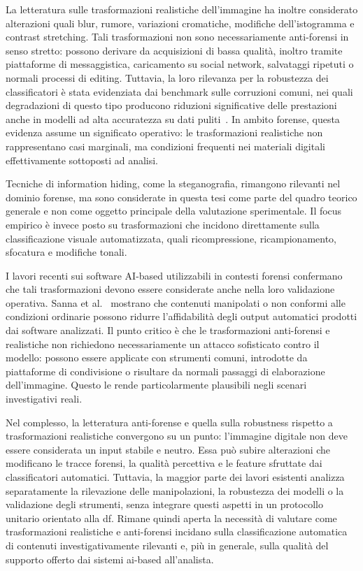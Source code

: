 La letteratura sulle trasformazioni realistiche dell'immagine ha inoltre considerato alterazioni quali blur, rumore, variazioni cromatiche, modifiche dell'istogramma e contrast stretching. Tali trasformazioni non sono necessariamente anti-forensi in senso stretto: possono derivare da acquisizioni di bassa qualità, inoltro tramite piattaforme di messaggistica, caricamento su social network, salvataggi ripetuti o normali processi di editing. Tuttavia, la loro rilevanza per la robustezza dei classificatori è stata evidenziata dai benchmark sulle corruzioni comuni, nei quali degradazioni di questo tipo producono riduzioni significative delle prestazioni anche in modelli ad alta accuratezza su dati puliti~\cite{hendrycks2019benchmarking}. In ambito forense, questa evidenza assume un significato operativo: le trasformazioni realistiche non rappresentano casi marginali, ma condizioni frequenti nei materiali digitali effettivamente sottoposti ad analisi.

Tecniche di information hiding, come la steganografia, rimangono rilevanti nel dominio forense, ma sono considerate in questa tesi come parte del quadro teorico generale e non come oggetto principale della valutazione sperimentale. Il focus empirico è invece posto su trasformazioni che incidono direttamente sulla classificazione visuale automatizzata, quali ricompressione, ricampionamento, sfocatura e modifiche tonali.

I lavori recenti sui software AI-based utilizzabili in contesti forensi confermano che tali trasformazioni devono essere considerate anche nella loro validazione operativa. Sanna et al.~\cite{sanna2024preliminary,sanna2025pixelperfect} mostrano che contenuti manipolati o non conformi alle condizioni ordinarie possono ridurre l'affidabilità degli output automatici prodotti dai software analizzati. Il punto critico è che le trasformazioni anti-forensi e realistiche non richiedono necessariamente un attacco sofisticato contro il modello: possono essere applicate con strumenti comuni, introdotte da piattaforme di condivisione o risultare da normali passaggi di elaborazione dell'immagine. Questo le rende particolarmente plausibili negli scenari investigativi reali.

Nel complesso, la letteratura anti-forense e quella sulla robustness rispetto a trasformazioni realistiche convergono su un punto: l'immagine digitale non deve essere considerata un input stabile e neutro. Essa può subire alterazioni che modificano le tracce forensi, la qualità percettiva e le feature sfruttate dai classificatori automatici. Tuttavia, la maggior parte dei lavori esistenti analizza separatamente la rilevazione delle manipolazioni, la robustezza dei modelli o la validazione degli strumenti, senza integrare questi aspetti in un protocollo unitario orientato alla \gls{df}. Rimane quindi aperta la necessità di valutare come trasformazioni realistiche e anti-forensi incidano sulla classificazione automatica di contenuti investigativamente rilevanti e, più in generale, sulla qualità del supporto offerto dai sistemi \gls{ai}-based all'analista.

